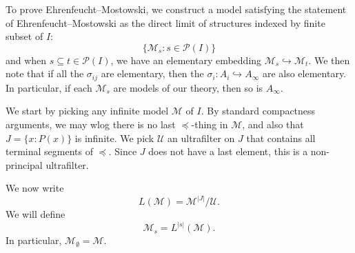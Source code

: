\documentclass[a4paper]{article}
\begin{document}
To prove Ehrenfeucht--Mostowski, we construct a model satisfying the statement of Ehrenfeucht--Mostowski as the direct limit of structures indexed by finite subset of $I$:
\[
  \{\mathcal{M}_s: s \in \mathcal{P}(I)\}
\]
and when $s \subseteq t \in \mathcal{P}(I)$, we have an elementary embedding $\mathcal{M}_s \hookrightarrow \mathcal{M}_t$. We then note that if all the $\sigma_{ij}$ are elementary, then the $\sigma_i: A_i \hookrightarrow A_\infty$ are also elementary. In particular, if each $\mathcal{M}_s$ are models of our theory, then so is $A_\infty$.

We start by picking any infinite model $\mathcal{M}$ of $I$. By standard compactness arguments, we may wlog there is no last $\preccurlyeq$-thing in $\mathcal{M}$, and also that $J = \{x: P(x)\}$ is infinite. We pick $\mathcal{U}$ an ultrafilter on $J$ that contains all terminal segments of $\preccurlyeq$. Since $J$ does not have a last element, this is a non-principal ultrafilter.

We now write
\[
  L(\mathcal{M}) = \mathcal{M}^{|J|}/\mathcal{U}.
\]
We will define
\[
  \mathcal{M}_s = L^{|s|}(\mathcal{M}).
\]
In particular, $\mathcal{M}_{\emptyset} = \mathcal{M}$.
\end{document}
